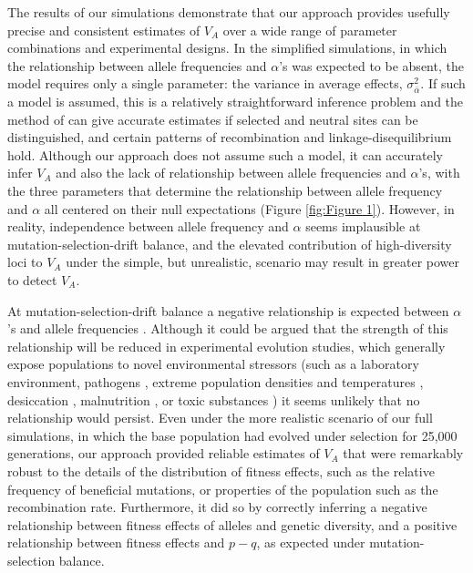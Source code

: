 \documentclass[12pt]{article}
\begin{document}
\begin{bibunit}
The results of our simulations demonstrate that our approach provides usefully precise and consistent estimates of $V_A$ over a wide range of parameter combinations and experimental designs. In the simplified simulations, in which the relationship between allele frequencies and $\alpha$'s was expected to be absent, the model requires only a single parameter: the variance in average effects, $\sigma^2_{\bar{\alpha}}$. If such a model is assumed, this is a relatively straightforward inference problem and the method of \citet{buffalo2019linked} can give accurate estimates if selected and neutral sites can be distinguished, and certain patterns of recombination and linkage-disequilibrium hold.  Although our approach does not assume such a model, it can accurately infer $V_A$ and also the lack of relationship between allele frequencies and $\alpha$'s, with the three parameters that determine the relationship between allele frequency and $\alpha$ all centered on their null expectations (Figure \ref{fig:Figure 1}). However, in reality, independence between allele frequency and $\alpha$ seems implausible at mutation-selection-drift balance, and the elevated contribution of high-diversity loci to $V_A$ under the simple, but unrealistic, scenario may result in greater power to detect $V_A$.

At mutation-selection-drift balance a negative relationship is expected between $\alpha$'s and allele frequencies \citep{Charlesworth.2010}. Although it could be argued that the strength of this relationship will be reduced in experimental evolution studies, which generally expose populations to novel environmental stressors (such as a laboratory environment, pathogens \citep{basu2024experimental}, extreme population densities \citep{joshi1996density} and temperatures \citep{singh2015egg, hsu2024reproductive}, desiccation \citep{gibbs1997physiological}, malnutrition \citep{kawecki2021genomic}, or toxic substances \citep{godinho2024limits, xiao2019experimental}) it seems unlikely that no relationship would persist. Even under the more realistic scenario of our full simulations, in which the base population had evolved under selection for 25,000 generations, our approach provided reliable estimates of $V_A$ that were remarkably robust to the details of the distribution of fitness effects, such as the relative frequency of beneficial mutations, or properties of the population such as the recombination rate. Furthermore, it did so by correctly inferring a negative relationship between fitness effects of alleles and genetic diversity, and a positive relationship between fitness effects and $p-q$, as expected under mutation-selection balance.


\end{bibunit}
\end{document}
